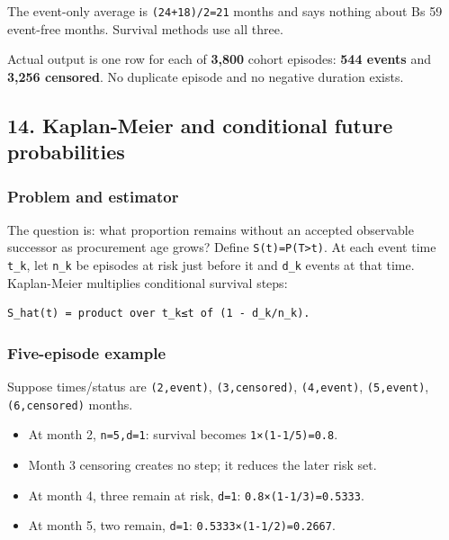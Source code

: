The event-only average is \texttt{(24+18)/2=21} months and says nothing
about B\textquotesingle s 59 event-free months. Survival methods use all
three.

Actual output is one row for each of \textbf{3,800} cohort episodes:
\textbf{544 events} and \textbf{3,256 censored}. No duplicate episode
and no negative duration exists.

\subsection{14. Kaplan-Meier and conditional future
probabilities}\label{14-kaplanmeier-and-conditional-future-probabilities}

\subsubsection{Problem and estimator}\label{problem-and-estimator}

The question is: what proportion remains without an accepted observable
successor as procurement age grows? Define
\texttt{S(t)=P(T\textgreater{}t)}. At each event time \texttt{t\_k}, let
\texttt{n\_k} be episodes at risk just before it and \texttt{d\_k}
events at that time. Kaplan-Meier multiplies conditional survival steps:

\begin{verbatim}
S_hat(t) = product over t_k≤t of (1 - d_k/n_k).
\end{verbatim}

\subsubsection{Five-episode example}\label{five-episode-example}

Suppose times/status are \texttt{(2,event)}, \texttt{(3,censored)},
\texttt{(4,event)}, \texttt{(5,event)}, \texttt{(6,censored)} months.

\begin{itemize}
\tightlist
\item
  At month 2, \texttt{n=5,d=1}: survival becomes \texttt{1×(1-1/5)=0.8}.
\item
  Month 3 censoring creates no step; it reduces the later risk set.
\item
  At month 4, three remain at risk, \texttt{d=1}:
  \texttt{0.8×(1-1/3)=0.5333}.
\item
  At month 5, two remain, \texttt{d=1}: \texttt{0.5333×(1-1/2)=0.2667}.
\end{itemize}


